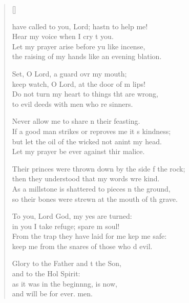 \settowidth{\versewidth}{Their princes were thrown down by the side of the rock; *}
\begin{verse}[\versewidth]
\begin{patverse}
 have called to you, Lord; hastn to help me!\Med\\
    Hear my voice when I cry t you.\\
Let my prayer arise before yu like incense,\Med\\
    the raising of my hands like an evening blation.

Set, O Lord, a guard ovr my mouth;\Med\\
    keep watch, O Lord, at the door of m lips!\\
Do not turn my heart to things tht are wrong,\Med\\
    to evil deeds with men who re sinners.

Never allow me to share \pointup{\i}n their feasting.\Med\\
    If a good man strikes or reproves me it \pointup{\i}s kindness;\\
but let the oil of the wicked not anint my head.\Med\\
    Let my prayer be ever against thir malice.

Their princes were thrown down by the side f the rock;\Med\\
    then they understood that my words wre kind.\\
As a millstone is shattered to pieces n the ground,\Med\\
    so their bones were strewn at the mouth of th grave.

To you, Lord God, my yes are turned:\Med\\
    in you I take refuge; spare m soul!\\
From the trap they have laid for me kep me safe:\Med\\
    keep me from the snares of those who d evil.

Glory to the Father and t the Son,\Med\\
    and to the Hol Spirit:\\
as it was in the beginn\pointup{\i}ng, is now,\Med\\
and will be for ever. men.
\end{patverse}
\end{verse}
